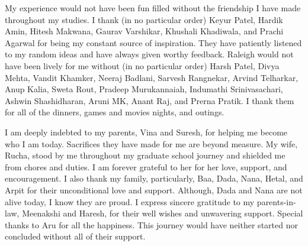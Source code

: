 \begin{acknowledgements}
My experience would not have been fun filled without the friendship I have made throughout my studies. 
I thank (in no particular order) Keyur Patel, Hardik Amin, Hitesh Makwana, Gaurav Varshikar, Khushali Khadiwala, and Prachi Agarwal for being my constant source of inspiration. 
They have patiently listened to my random ideas and have always given worthy feedback. 
Raleigh would not have been lively for me without (in no particular order) Harsh Patel, Divya Mehta, Vandit Khamker, Neeraj Badlani, Sarvesh Rangnekar, Arvind Telharkar, Anup Kalia, Sweta Rout, Pradeep Murukannaiah,  Indumathi Srinivasachari, Ashwin Shashidharan, Aruni MK, Anant Raj, and Prerna Pratik.
I thank them for all of the dinners, games and movies nights, and outings. 

I am deeply indebted to my parents, Vina and Suresh, for helping me become who I am today. 
Sacrifices they have made for me are beyond measure. 
My wife, Rucha, stood by me throughout my graduate school journey and shielded me from chores and duties. 
I am forever grateful to her for her love, support, and encouragement. 
I also thank my family, particularly, Baa, Dada, Nana, Hetal, and Arpit for their unconditional love and support. 
Although, Dada and Nana are not alive today, I know they are proud. 
I express sincere gratitude to my parents-in-law, Meenakshi and Haresh, for their well wishes and unwavering support. 
Special thanks to Aru for all the happiness. 
This journey would have neither started nor concluded without all of their support. 

\end{acknowledgements}

\thesistableofcontents

\thesislistoftables

\thesislistoffigures
